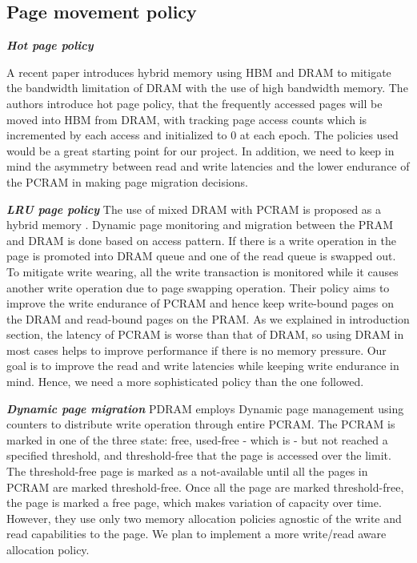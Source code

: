\documentclass[a4paper, 11pt, conference]{ieeeconf}      %
\begin{document}
\subsection{Page movement policy} \vspace{1mm}
\textit{\textbf{Hot page policy}}

	A recent paper introduces hybrid memory using HBM and DRAM \cite{meswani2015heterogeneous} to mitigate the bandwidth limitation of DRAM with the use of high bandwidth memory.  The authors introduce hot page policy, that the frequently accessed pages will be moved into HBM from DRAM, with tracking page access counts which is incremented by each access and initialized to 0 at each epoch. The policies used would be a great starting point for our project. In addition, we need to keep in mind the asymmetry between read and write latencies and the lower endurance of the PCRAM in making page migration decisions.

\textit{\textbf{LRU page policy}}
	The use of mixed DRAM with PCRAM is proposed as a hybrid memory \cite{seok2011migration}.  Dynamic  page monitoring and migration between the PRAM and DRAM is done based on access pattern.  If there is a write operation in the page is promoted into DRAM queue and one of the read queue is swapped out.  To mitigate write wearing, all the write transaction is monitored while it causes another write operation due to page swapping operation. Their policy aims to improve the write endurance of PCRAM and hence keep write-bound pages on the DRAM and read-bound pages on the PRAM. As we explained in introduction section, the latency of PCRAM is worse than that of DRAM, so using DRAM in most cases helps to improve performance if there is no memory pressure.  Our goal is to improve the read and write latencies while keeping write endurance in mind. Hence, we need a more sophisticated policy than the one followed.

\textit{\textbf{Dynamic page migration}}
PDRAM\cite{dhiman2009pdram} employs Dynamic page management using counters to distribute write operation through entire PCRAM.  The PCRAM is marked in one of the three state: free, used-free - which is - but not reached a specified threshold, and threshold-free that the page is accessed over the limit.  The threshold-free page is marked as a not-available until all the pages in PCRAM are marked threshold-free.  Once all the page are marked threshold-free, the page is marked a free page, which makes variation of capacity over time. However, they use only two memory allocation policies agnostic of the write and read capabilities to the page. We plan to implement a more write/read aware allocation policy.
\end{document}
